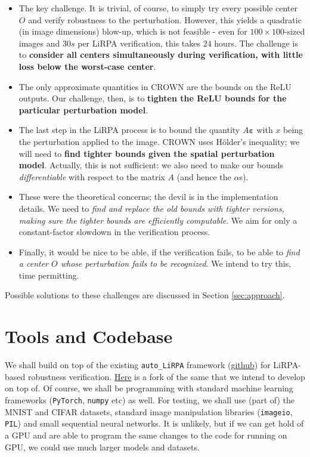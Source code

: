 \documentclass{article}
\begin{document}
\begin{itemize}
    \item The key challenge. It is trivial, of course, to simply try every possible center $O$ and verify robustness to the perturbation. However, this yields a quadratic (in image dimensions) blow-up, which is not feasible - even for $100\times 100$-sized images and $30s$ per LiRPA verification, this takes $24$ hours. The challenge is to \textbf{consider all centers simultaneously during verification, with little loss below the worst-case center}.
    \item The only approximate quantities in CROWN are the bounds on the ReLU outputs. Our challenge, then, is to \textbf{tighten the ReLU bounds for the particular perturbation model}.
    \item The last step in the LiRPA process is to bound the quantity $A\bm \varepsilon$ with $x$ being the perturbation applied to the image. CROWN uses Hölder's inequality; we will need to \textbf{find tighter bounds given the spatial perturbation model}. Actually, this is not sufficient: we also need to make our bounds \emph{differentiable} with respect to the matrix $A$ (and hence the $\alpha$s).
    \item These were the theoretical concerns; the devil is in the implementation details. We need to \emph{find and replace the old bounds with tighter versions, making sure the tighter bounds are efficiently computable}. We aim for only a constant-factor slowdown in the verification process.
    \item Finally, it would be nice to be able, if the verification fails, to be able to \emph{find a center $O$ whose perturbation fails to be recognized}. We intend to try this, time permitting.
\end{itemize}

Possible solutions to these challenges are discussed in Section \ref{sec:approach}.

\section{Tools and Codebase}

We shall build on top of the existing \texttt{auto\_LiRPA} framework (\href{https://github.com/Verified-Intelligence/auto_LiRPA}{github}) for LiRPA-based robustness verification. \href{https://github.com/mathismusic/auto_LiRPA_proj}{Here} is a fork of the same that we intend to develop on top of. Of course, we shall be programming with standard machine learning frameworks (\texttt{PyTorch}, \texttt{numpy} etc) as well. For testing, we shall use (part of) the MNIST and CIFAR datasets, standard image manipulation libraries (\texttt{imageio}, \texttt{PIL}) and small sequential neural networks. It is unlikely, but if we can get hold of a GPU and are able to program the same changes to the code for running on GPU, we could use much larger models and datasets.
\end{document}
